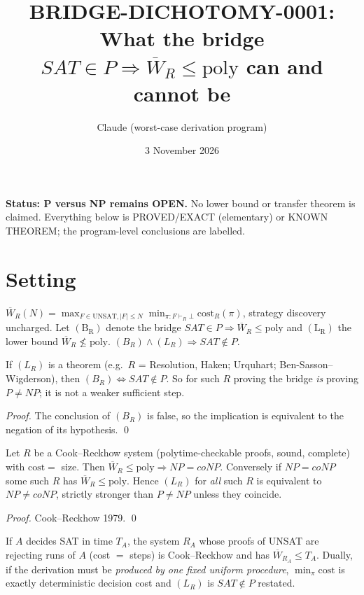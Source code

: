 \documentclass[11pt]{article}
\title{BRIDGE-DICHOTOMY-0001: What the bridge $SAT\in P\Rightarrow\overline W_R\le\mathrm{poly}$ can and cannot be}
\author{Claude (worst-case derivation program)}\date{3 November 2026}
\begin{document}
\maketitle
\noindent\textbf{Status: P versus NP remains OPEN.} No lower bound or transfer theorem is claimed. Everything below is PROVED/EXACT (elementary) or KNOWN THEOREM; the program-level conclusions are labelled.

\section*{Setting}
$\overline W_R(N)=\max_{F\in\mathrm{UNSAT},|F|\le N}\min_{\pi:F\vdash_R\bot}\mathrm{cost}_R(\pi)$, strategy discovery uncharged. Let $\mathrm{(B_R)}$ denote the bridge $SAT\in P\Rightarrow\overline W_R\le\mathrm{poly}$ and $\mathrm{(L_R)}$ the lower bound $\overline W_R\not\le\mathrm{poly}$. $(B_R)\wedge(L_R)\Rightarrow SAT\notin P$.

\begin{proposition}
If $(L_R)$ is a theorem (e.g.\ $R$ = Resolution, Haken; Urquhart; Ben-Sasson--Wigderson), then $(B_R)\iff SAT\notin P$. So for such $R$ proving the bridge \emph{is} proving $P\neq NP$; it is not a weaker sufficient step.
\end{proposition}
\emph{Proof.} The conclusion of $(B_R)$ is false, so the implication is equivalent to the negation of its hypothesis. \qed

\begin{proposition}[Free strategy $=$ nondeterminism]
Let $R$ be a Cook--Reckhow system (polytime-checkable proofs, sound, complete) with $\mathrm{cost}=$ size. Then $\overline W_R\le\mathrm{poly}\Rightarrow NP=coNP$. Conversely if $NP=coNP$ some such $R$ has $\overline W_R\le\mathrm{poly}$. Hence $(L_R)$ for \emph{all} such $R$ is equivalent to $NP\neq coNP$, strictly stronger than $P\neq NP$ unless they coincide.
\end{proposition}
\emph{Proof.} Cook--Reckhow 1979. \qed

\begin{proposition}
If $A$ decides SAT in time $T_A$, the system $R_A$ whose proofs of UNSAT are rejecting runs of $A$ (cost $=$ steps) is Cook--Reckhow and has $\overline W_{R_A}\le T_A$. Dually, if the derivation must be \emph{produced by one fixed uniform procedure}, $\min_\pi\mathrm{cost}$ is exactly deterministic decision cost and $(L_R)$ is $SAT\notin P$ restated.
\end{proposition}
\end{document}
